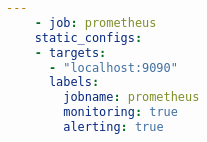\begin{lstlisting}[language=Yaml,frame=single,caption={Configuración estática de prometheus.yml:},label={lst:prometheus.yml}]
    ---
    - job: prometheus
    static_configs:
    - targets:
      - "localhost:9090"
      labels:
        jobname: prometheus
        monitoring: true
        alerting: true
    \end{lstlisting}